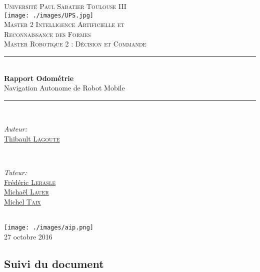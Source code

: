 \documentclass[10pt,a4paper]{article}
\begin{document}
\pagestyle {plain}

\begin{titlepage}


\newcommand{\HRule}{\rule{\linewidth}{0.5mm}} 

\center

\textsc{\Large Université Paul Sabatier Toulouse III}\\[1cm] 
\texttt{[image: ./images/UPS.jpg]}\\[0.6cm] 


\textsc{Master 2 Intelligence Artificielle et \\ 
Reconnaissance des Formes \\ Master Robotique 2 : Décision et Commande}\\[3cm] 

\HRule \\[0.4cm]
{ \huge \bfseries Rapport Odométrie}\\[0.4cm] 
\LARGE Navigation Autonome de Robot Mobile

\HRule \\[3.5cm]
 

\begin{minipage}{0.4\textwidth}
\begin{flushleft} \large
\emph{Auteur:}\\
\href{mailto:lagoute.31@gmail.com}{Thibault \textsc{Lagoute} }  
\end{flushleft}
\end{minipage}
~
\begin{minipage}{0.4\textwidth}
\begin{flushright} \large
\emph{Tuteur:} \\
\href{mailto:lerasle@laas.fr}{Frédéric \textsc{Lerasle}}\\
\href{mailto:michael.lauer@laas.fr}{Michaël \textsc{Lauer}} \\
\href{mailto:taix@laas.f}{Michel \textsc{Taix}}
\end{flushright}
\end{minipage}\\[1cm]

\texttt{[image: ./images/aip.png]} \\[1.1cm] 

\large 27 octobre 2016
 

\end{titlepage}

\subsection*{Suivi du document}
\end{document}
